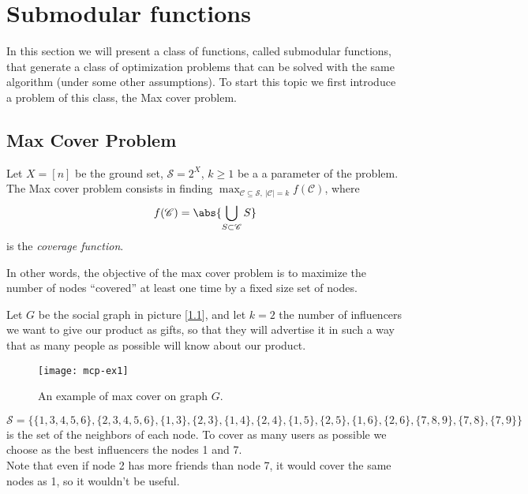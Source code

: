 \chapter[Submodular functions]{Submodular functions\raisebox{.3\baselineskip}{\normalsize\footnotemark}}
\label{sec:submodular-chapter}

In this section we will present a class of functions, called submodular functions, that generate a class of optimization problems that can be solved with the same algorithm (under some other assumptions). To start this topic we first introduce a problem of this class, the Max cover problem.

\section{Max Cover Problem}\label{sec:max-cover}

\begin{defn}\label{max-cover}
    Let $X=[n]$ be the ground set, $\mathscr{S}=2^X$, $k\geq1$ be a a parameter of the problem. The Max cover problem consists in finding
    $\max_{\mathscr{C} \subseteq \mathscr{S},\ |\mathscr{C}|=k} f(\mathscr{C})$, where
    \begin{equation}\label{eq:coverage}
        f(\mathscr{C}) = \abs{\bigcup_{S \subset \mathscr{C}} S}
    \end{equation}
    is the \textit{coverage function}.
\end{defn}

In other words, the objective of the max cover problem is to maximize the number of nodes ``covered'' at least one time by a fixed size set of nodes.

\begin{ex}\label{ex:mcp-ex1}
    Let $G$ be the social graph in picture [\ref{fig:mcp-ex1}], and let $k=2$ the number of influencers we want to give our product as gifts, so that they will advertise it in such a way that as many people as possible will know about our product.
    
    \begin{figure}[h!]
        \centering
        \texttt{[image: mcp-ex1]}
        \caption{An example of max cover on graph $G$.}
        \label{fig:mcp-ex1}
    \end{figure}

    $\mathscr{S} = \{ \{1,3,4,5,6\}, \{2,3,4,5,6\}, \{1,3\}, \{2,3\}, \{1,4\}, \{2,4\}, \{1,5\}, \{2,5\}, \{1,6\}, \{2,6\}, \{7,8,9\}, \{7,8\}, \{7,9\} \}$ is the set of the neighbors of each node. To cover as many users as possible we choose as the best influencers the nodes 1 and 7.\\
    Note that even if node 2 has more friends than node 7, it would cover the same nodes as 1, so it wouldn't be useful.
\end{ex}

